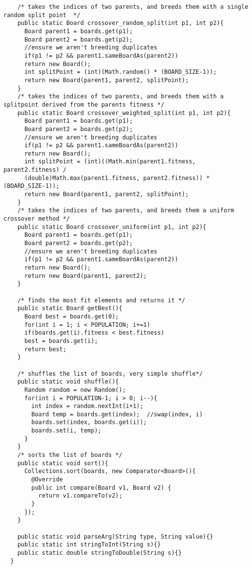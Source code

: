 \documentclass[a4paper,11pt]{article}
\begin{document}
\begin{lstlisting}
    /* takes the indices of two parents, and breeds them with a single random split point  */
    public static Board crossover_random_split(int p1, int p2){
      Board parent1 = boards.get(p1);
      Board parent2 = boards.get(p2);
      //ensure we aren't breeding duplicates
      if(p1 != p2 && parent1.sameBoardAs(parent2))
      return new Board();
      int splitPoint = (int)(Math.random() * (BOARD_SIZE-1));
      return new Board(parent1, parent2, splitPoint);
    }
    /* takes the indices of two parents, and breeds them with a splitpoint derived from the parents fitness */
    public static Board crossover_weighted_split(int p1, int p2){
      Board parent1 = boards.get(p1);
      Board parent2 = boards.get(p2);
      //ensure we aren't breeding duplicates
      if(p1 != p2 && parent1.sameBoardAs(parent2))
      return new Board(); 
      int splitPoint = (int)((Math.min(parent1.fitness, parent2.fitness) /
      (double)Math.max(parent1.fitness, parent2.fitness)) * (BOARD_SIZE-1));
      return new Board(parent1, parent2, splitPoint);
    }
    /* takes the indices of two parents, and breeds them a uniform crossover method */
    public static Board crossover_uniform(int p1, int p2){
      Board parent1 = boards.get(p1);
      Board parent2 = boards.get(p2);
      //ensure we aren't breeding duplicates
      if(p1 != p2 && parent1.sameBoardAs(parent2))
      return new Board(); 
      return new Board(parent1, parent2);
    }

    /* finds the most fit elements and returns it */
    public static Board getBest(){
      Board best = boards.get(0);
      for(int i = 1; i < POPULATION; i+=1)
      if(boards.get(i).fitness < best.fitness)
      best = boards.get(i);
      return best;
    }

    /* shuffles the list of boards, very simple shuffle*/
    public static void shuffle(){
      Random random = new Random();
      for(int i = POPULATION-1; i > 0; i--){
        int index = random.nextInt(i+1);
        Board temp = boards.get(index);  //swap(index, i)
        boards.set(index, boards.get(i));
        boards.set(i, temp);
      }
    }
    /* sorts the list of boards */
    public static void sort(){
      Collections.sort(boards, new Comparator<Board>(){
        @Override
        public int compare(Board v1, Board v2) {
          return v1.compareTo(v2);
        }
      });
    }

    public static void parseArg(String type, String value){}
    public static int stringToInt(String s){}
    public static double stringToDouble(String s){}
  }


\end{lstlisting}
\end{document}
